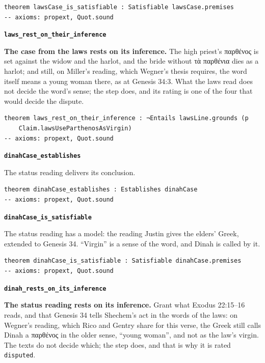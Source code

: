 \documentclass[11pt]{article}
\begin{document}
{\small\begin{verbatim}
theorem lawsCase_is_satisfiable : Satisfiable lawsCase.premises
-- axioms: propext, Quot.sound
\end{verbatim}}
\par\medskip\noindent\textbf{\texttt{laws\_\allowbreak{}rest\_\allowbreak{}on\_\allowbreak{}their\_\allowbreak{}inference}}\par\nobreak\noindent
\textbf{The case from the laws rests on its inference.} The high priest’s παρθένος is set against the widow and the harlot, and the bride without τὰ παρθένια dies as a harlot; and still, on Miller’s reading, which Wegner’s thesis requires, the word itself means a young woman there, as at Genesis 34:3. What the laws read does not decide the word’s sense; the step does, and its rating is one of the four that would decide the dispute.

{\small\begin{verbatim}
theorem laws_rest_on_their_inference : ¬Entails lawsLine.grounds (p
    Claim.lawsUseParthenosAsVirgin)
-- axioms: propext, Quot.sound
\end{verbatim}}
\par\medskip\noindent\textbf{\texttt{dinah\allowbreak{}Case\_\allowbreak{}establishes}}\par\nobreak\noindent
The status reading delivers its conclusion.

{\small\begin{verbatim}
theorem dinahCase_establishes : Establishes dinahCase
-- axioms: propext, Quot.sound
\end{verbatim}}
\par\medskip\noindent\textbf{\texttt{dinah\allowbreak{}Case\_\allowbreak{}is\_\allowbreak{}satisfiable}}\par\nobreak\noindent
The status reading has a model: the reading Justin gives the elders’ Greek, extended to Genesis 34. “Virgin” is a sense of the word, and Dinah is called by it.

{\small\begin{verbatim}
theorem dinahCase_is_satisfiable : Satisfiable dinahCase.premises
-- axioms: propext, Quot.sound
\end{verbatim}}
\par\medskip\noindent\textbf{\texttt{dinah\_\allowbreak{}rests\_\allowbreak{}on\_\allowbreak{}its\_\allowbreak{}inference}}\par\nobreak\noindent
\textbf{The status reading rests on its inference.} Grant what Exodus 22:15–16 reads, and that Genesis 34 tells Shechem’s act in the words of the laws: on Wegner’s reading, which Rico and Gentry share for this verse, the Greek still calls Dinah a παρθένος in the older sense, “young woman”, and not as the law’s virgin. The texts do not decide which; the step does, and that is why it is rated \texttt{disputed}.
\end{document}
